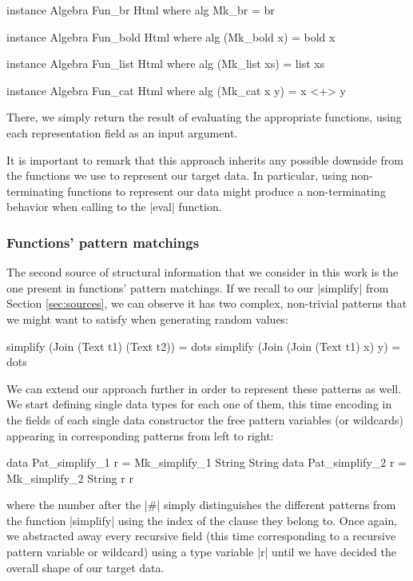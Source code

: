 \begin{code}
instance Algebra Fun_br Html where
  alg Mk_br = br

instance Algebra Fun_bold Html where
  alg (Mk_bold x) = bold x

instance Algebra Fun_list Html where
  alg (Mk_list xs) = list xs

instance Algebra Fun_cat Html where
  alg (Mk_cat x y) = x <+> y
\end{code}
%
There, we simply return the result of evaluating the appropriate functions,
using each representation field as an input argument.


It is important to remark that this approach inherits any possible downside from
the functions we use to represent our target data.
%
In particular, using non-terminating functions to represent our data might
produce a non-terminating behavior when calling to the |eval| function.


%
%
\subsubsection{Functions' pattern matchings}

The second source of structural information that we consider in this work is the
one present in functions' pattern matchings.
%
If we recall to our |simplify| from Section \ref{sec:sources}, we can observe it
has two complex, non-trivial patterns that we might want to satisfy when
generating random values:

\begin{code}
simplify (Join (Text t1) (Text t2))   = dots
simplify (Join (Join (Text t1) x) y)  = dots
\end{code}

We can extend our approach further in order to represent these patterns as well.
%
We start defining single data types for each one of them, this time encoding in
the fields of each single data constructor the free pattern variables (or
wildcards) appearing in corresponding patterns from left to right:

\begin{code}
data Pat_simplify_1 r = Mk_simplify_1 String String
data Pat_simplify_2 r = Mk_simplify_2 String r r
\end{code}
%
where the number after the |#| simply distinguishes the different patterns from
the function |simplify| using the index of the clause they belong to.
%
Once again, we abstracted away every recursive field (this time corresponding to
a recursive pattern variable or wildcard) using a type variable |r| until we
have decided the overall shape of our target data.


